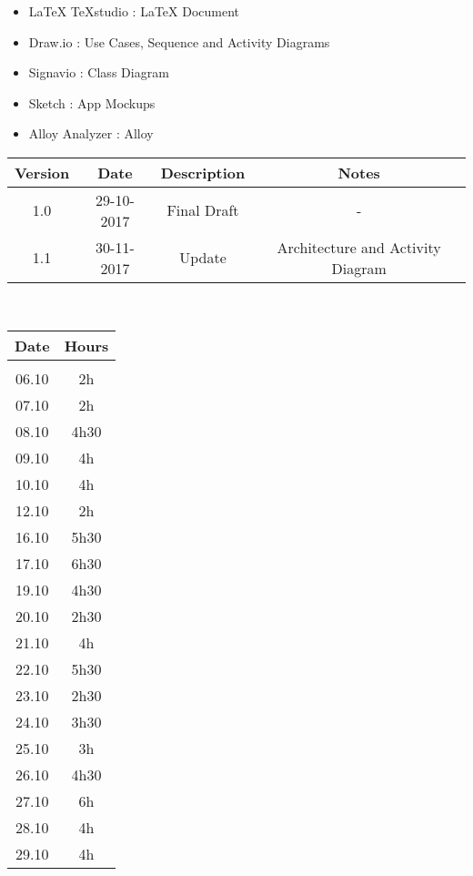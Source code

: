 \begin{itemize}
	\setlength{\leftskip}{1cm}
	\item LaTeX TeXstudio : LaTeX Document
	\item Draw.io : Use Cases, Sequence and Activity Diagrams
	\item Signavio : Class Diagram
	\item Sketch : App Mockups
	\item Alloy Analyzer : Alloy
\end{itemize}

\vspace{0.5cm}
\begin{tabular}[H]{c|c|c|c}
	Version & Date & Description & Notes\\
	\hline
	\rule{0pt}{4ex}1.0	&	29-10-2017	&	Final Draft	&	-\\
	\rule{0pt}{4ex}1.1	&	30-11-2017	&	Update	&	Architecture and Activity Diagram
\end{tabular}
\vspace{0.5cm}\\

\vspace{0.5cm}
\begin{tabular}[H]{cc}
	Date & Hours\\
	\hline\\
	06.10	&	2h\\
	07.10	&	2h\\
	08.10	&	4h30\\
	09.10	&	4h\\
	10.10	&	4h\\
	12.10	&	2h\\
	16.10	&	5h30\\
	17.10	&	6h30\\
	19.10	&	4h30\\
	20.10	&	2h30\\
	21.10	&	4h\\
	22.10	&	5h30\\
	23.10	&	2h30\\
	24.10	&	3h30\\
	25.10	&	3h\\
	26.10	&	4h30\\
	27.10	&	6h\\
	28.10	&	4h\\
	29.10	&	4h
\end{tabular}

